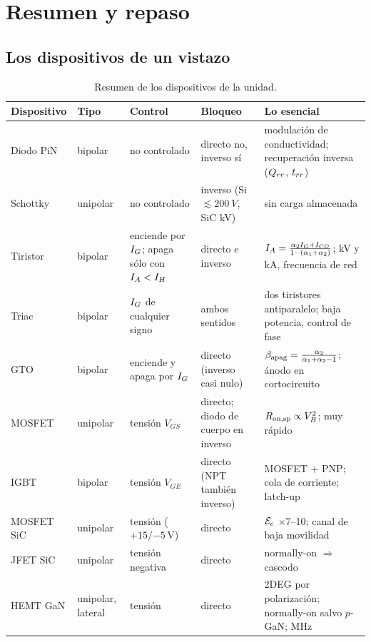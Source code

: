 \clearpage
\section{Resumen y repaso}

\subsection{Los dispositivos de un vistazo}

\begin{table}[H]
\centering\small
\begin{tabularx}{\textwidth}{>{\raggedright\arraybackslash}p{2.0cm}>{\raggedright\arraybackslash}p{1.6cm}>{\raggedright\arraybackslash}p{2.6cm}>{\raggedright\arraybackslash}p{2.2cm}>{\raggedright\arraybackslash}X}
\toprule
Dispositivo & Tipo & Control & Bloqueo & Lo esencial \\
\midrule
Diodo PiN & bipolar & no controlado & directo no, inverso sí & modulación de conductividad; recuperación inversa ($Q_{rr}$, $t_{rr}$) \\
Schottky & unipolar & no controlado & inverso (Si $\lesssim\SI{200}{V}$, SiC kV) & sin carga almacenada \\
Tiristor & bipolar & enciende por $I_{G}$; apaga sólo con $I_{A}<I_H$ & directo e inverso & $I_{A}=\frac{\alpha_2I_{G}+I_{CO}}{1-(\alpha_1+\alpha_2)}$; kV y kA, frecuencia de red \\
Triac & bipolar & $I_{G}$ de cualquier signo & ambos sentidos & dos tiristores antiparalelo; baja potencia, control de fase \\
GTO & bipolar & enciende y apaga por $I_{G}$ & directo (inverso casi nulo) & $\beta_{\mathrm{apag}}=\frac{\alpha_2}{\alpha_1+\alpha_2-1}$; ánodo en cortocircuito \\
MOSFET & unipolar & tensión $V_{GS}$ & directo; diodo de cuerpo en inverso & $R_{\mathrm{on,sp}}\propto V_{B}^2$; muy rápido \\
IGBT & bipolar & tensión $V_{GE}$ & directo (NPT también inverso) & MOSFET $+$ PNP; cola de corriente; latch-up \\
MOSFET SiC & unipolar & tensión ($+15/{-5}$\,V) & directo & $\mathcal{E}_c$ $\times$7--10; canal de baja movilidad \\
JFET SiC & unipolar & tensión negativa & directo & normally-on $\Rightarrow$ cascodo \\
HEMT GaN & unipolar, lateral & tensión & directo & 2DEG por polarización; normally-on salvo $p$-GaN; MHz \\
\bottomrule
\end{tabularx}
\caption{Resumen de los dispositivos de la unidad.}
\label{tab:resumen-dispositivos}
\end{table}

